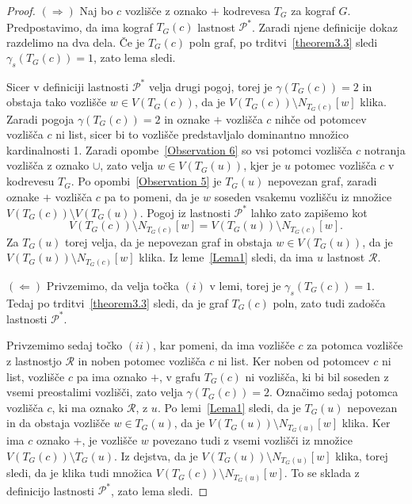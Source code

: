 \documentclass[12pt,a4paper,twoside]{article}
\theoremstyle{definition} %
\theoremstyle{plain} %
\numberwithin{equation}{section}  %
\begin{document}
\begin{proof}
$(\Rightarrow)$ Naj bo $c$ vozlišče z oznako $+$ kodrevesa $T_G$ za kograf $G$. Predpostavimo, da ima kograf $T_G(c)$ lastnost $\mathcal{P^*}$. Zaradi njene definicije dokaz razdelimo na dva dela.
Če je $T_G(c)$ poln graf, po trditvi~\ref{theorem3.3} sledi $\gamma_s(T_G(c)) = 1$, zato lema sledi.

Sicer v definiciji lastnosti $\mathcal{P^*}$ velja drugi pogoj, torej je $\gamma(T_G(c)) = 2$ in obstaja tako vozlišče $w \in V(T_G(c))$, da je $V(T_G(c)) \setminus N_{T_G(c)}[w]$ klika. Zaradi pogoja $\gamma(T_G(c)) = 2$ in oznake $+$ vozlišča $c$ nihče od potomcev vozlišča $c$ ni list, sicer bi to vozlišče predstavljalo dominantno množico kardinalnosti 1. Zaradi opombe~\ref{Observation 6} so vsi potomci vozlišča $c$ notranja vozlišča z oznako $\cup$, zato velja $w \in V(T_G(u))$, kjer je $u$ potomec vozlišča $c$ v kodrevesu $T_G$. Po opombi~\ref{Observation 5} je $T_G(u)$ nepovezan graf, zaradi oznake $+$ vozlišča $c$ pa to pomeni, da je $w$ soseden vsakemu vozlišču iz množice $V(T_G(c)) \setminus V(T_G(u))$. Pogoj iz lastnosti $\mathcal{P^*}$ lahko zato zapišemo kot 
$$V(T_G(c)) \setminus N_{T_G(c)}[w] = V(T_G(u)) \setminus N_{T_G(c)}[w].$$ Za $T_G(u)$ torej velja, da je nepovezan graf in obstaja $w \in V(T_G(u))$, da je $V(T_G(u)) \setminus N_{T_G(c)}[w]$ klika. Iz leme~\ref{Lema1} sledi, da ima $u$ lastnost $\mathcal{R}$.

\medskip
$(\Leftarrow)$ Privzemimo, da velja točka $(i)$ v lemi, torej je $\gamma_s(T_G(c)) = 1$. Tedaj po trditvi~\ref{theorem3.3} sledi, da je graf $T_G(c)$ poln, zato tudi zadošča lastnosti $\mathcal{P^*}$.

Privzemimo sedaj točko $(ii)$, kar pomeni, da ima vozlišče $c$ za potomca vozlišče z lastnostjo $\mathcal{R}$ in noben potomec vozlišča $c$ ni list. Ker noben od potomcev $c$ ni list, vozlišče $c$ pa ima oznako $+$, v grafu $T_G(c)$ ni vozlišča, ki bi bil soseden z vsemi preostalimi vozlišči, zato velja $\gamma(T_G(c)) = 2$. Označimo sedaj potomca vozlišča $c$, ki ma oznako $\mathcal{R}$, z $u$. Po lemi~\ref{Lema1} sledi, da je $T_G(u)$ nepovezan in da obstaja vozlišče $w \in T_G(u)$, da je $V(T_G(u)) \setminus N_{T_G(u)}[w]$ klika. Ker ima $c$ oznako $+$, je vozlišče $w$ povezano tudi z vsemi vozlišči iz množice $V(T_G(c)) \setminus T_G(u)$. Iz dejstva, da je $V(T_G(u)) \setminus N_{T_G(u)}[w]$ klika, torej sledi, da je klika tudi množica $V(T_G(c)) \setminus N_{T_G(u)}[w]$. To se sklada z definicijo lastnosti $\mathcal{P^*}$, zato lema sledi.
\end{proof}
\end{document}
